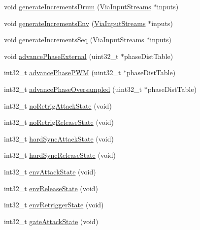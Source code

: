 \begin{DoxyCompactItemize}
\item 
void \mbox{\hyperlink{class_meta_controller_a89346194e41db563a6cc215d8223e691}{generate\+Increments\+Drum}} (\mbox{\hyperlink{class_via_input_streams}{Via\+Input\+Streams}} $\ast$inputs)
\item 
void \mbox{\hyperlink{class_meta_controller_ab5edafda7b2d14c42b80d56b3c1aba09}{generate\+Increments\+Env}} (\mbox{\hyperlink{class_via_input_streams}{Via\+Input\+Streams}} $\ast$inputs)
\item 
void \mbox{\hyperlink{class_meta_controller_ab78ff8455308bff2fb7ebff51c33790b}{generate\+Increments\+Seq}} (\mbox{\hyperlink{class_via_input_streams}{Via\+Input\+Streams}} $\ast$inputs)
\item 
void \mbox{\hyperlink{class_meta_controller_af6511123a3f058b34f548819022fa7ab}{advance\+Phase\+External}} (uint32\+\_\+t $\ast$phase\+Dist\+Table)
\item 
int32\+\_\+t \mbox{\hyperlink{class_meta_controller_a3cc79ab820032663f6b05497e2f8b5d2}{advance\+Phase\+P\+WM}} (uint32\+\_\+t $\ast$phase\+Dist\+Table)
\item 
int32\+\_\+t \mbox{\hyperlink{class_meta_controller_a03bce7a9b690534f7daff9c990c07cc4}{advance\+Phase\+Oversampled}} (uint32\+\_\+t $\ast$phase\+Dist\+Table)
\item 
int32\+\_\+t \mbox{\hyperlink{class_meta_controller_a83b8da3f1d5f19ed4e3bccba2500691b}{no\+Retrig\+Attack\+State}} (void)
\item 
int32\+\_\+t \mbox{\hyperlink{class_meta_controller_ae3fe6a696bbbdd4eed7467b610ec72b3}{no\+Retrig\+Release\+State}} (void)
\item 
int32\+\_\+t \mbox{\hyperlink{class_meta_controller_ad61c4e2a782f372752215b10d9490319}{hard\+Sync\+Attack\+State}} (void)
\item 
int32\+\_\+t \mbox{\hyperlink{class_meta_controller_a3fd09e0d250fb666d60d643ea894e1ea}{hard\+Sync\+Release\+State}} (void)
\item 
int32\+\_\+t \mbox{\hyperlink{class_meta_controller_afd3d1fbf5121b09b014fa6b64468c78c}{env\+Attack\+State}} (void)
\item 
int32\+\_\+t \mbox{\hyperlink{class_meta_controller_a2025aa7292568159bc5e4708d305b62a}{env\+Release\+State}} (void)
\item 
int32\+\_\+t \mbox{\hyperlink{class_meta_controller_ad96c9b0dd76428cbbf4cc7e578a69319}{env\+Retrigger\+State}} (void)
\item 
int32\+\_\+t \mbox{\hyperlink{class_meta_controller_aa87c02c2098f16612329abe3dcb71710}{gate\+Attack\+State}} (void)

\end{DoxyCompactItemize}
